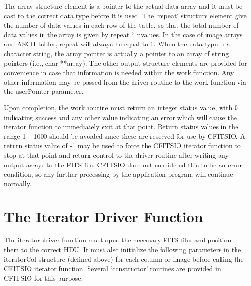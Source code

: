 \documentclass[11pt]{book}
\begin{document}
The array structure element is a pointer to the actual data array and
it must be cast to the correct data type before it is used.  The
`repeat' structure element give the number of data values in each row
of the table, so that the total number of data values in the array is
given by repeat * nvalues.  In the case of image arrays and ASCII
tables, repeat will always be equal to 1.  When the data type is a
character string, the array pointer is actually a pointer to an array
of string pointers (i.e., char **array).  The other output structure
elements are provided for convenience in case that information is
needed within the work function.  Any other information may be passed
from the driver routine to the work function via the userPointer
parameter.

Upon completion, the work routine must return an integer status value,
with 0 indicating success and any other value indicating an error which
will cause the iterator function to immediately exit at that point.  Return status
values in the range 1 -- 1000 should be avoided since these are
reserved for use by CFITSIO.  A return status value of -1 may be used to
force the CFITSIO iterator function to stop at that point and return
control to the driver routine after writing any output arrays to the
FITS file.  CFITSIO does not considered this to be an error condition,
so any further processing by the application program will continue normally.


\section{The Iterator Driver Function}

The iterator driver function must open the necessary FITS files and
position them to the correct HDU.  It must also initialize the following
parameters in the iteratorCol structure (defined above) for each
column or image before calling the CFITSIO iterator function.
Several `constructor' routines are provided in CFITSIO for this
purpose.
\end{document}
